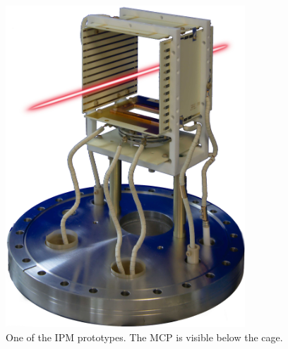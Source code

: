 \begin{figure}[!ht]  
  \includegraphics[width=0.8\textwidth]{04_IPHI_Test/figures/fig000_IPM_photo2}
  \caption[One of the IPM prototypes]{One of the IPM prototypes. The MCP is visible below the cage.} %
  \label{chap4:IPM_photo2}
\end{figure}
